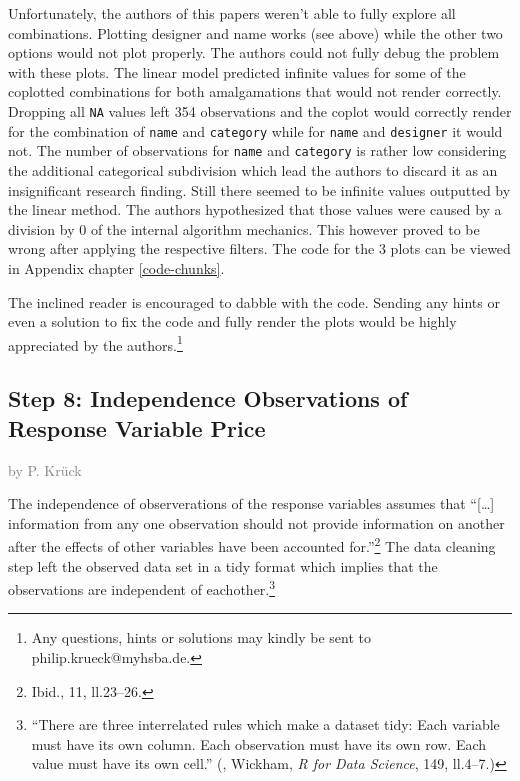 \documentclass[a4paper, nobind]{templates/ociamthesis}
\begin{document}
Unfortunately, the authors of this papers weren't able to fully explore all combinations.
Plotting designer and name works (see above) while the other two options would not plot properly.
The authors could not fully debug the problem with these plots.
The linear model predicted infinite values for some of the coplotted combinations for both amalgamations that would not render correctly.
Dropping all \texttt{NA} values left 354 observations and the coplot would correctly render for the combination of \texttt{name} and \texttt{category} while for \texttt{name} and \texttt{designer} it would not. The number of observations for \texttt{name} and \texttt{category} is rather low considering the additional categorical subdivision which lead the authors to discard it as an insignificant research finding.
Still there seemed to be infinite values outputted by the linear method. The authors hypothesized that those values were caused by a division by 0 of the internal algorithm mechanics. This however proved to be wrong after applying the respective filters.
The code for the 3 plots can be viewed in Appendix chapter \ref{code-chunks}.

The inclined reader is encouraged to dabble with the code. Sending any hints or even a solution to fix the code and fully render the plots would be highly appreciated by the authors.\footnote{Any questions, hints or solutions may kindly be sent to philip.krueck@myhsba.de.}

\hypertarget{step-8-independence-observations-of-response-variable-price}{%
\subsection{Step 8: Independence Observations of Response Variable Price}\label{step-8-independence-observations-of-response-variable-price}}

\textcolor{gray}{by P. Krück}

The independence of observerations of the response variables assumes that ``{[}\ldots{}{]} information from any one observation should not provide information on another after the effects of other variables have been accounted for.''\footnote{Ibid., 11, ll.23--26.}
The data cleaning step left the observed data set in a tidy format which implies that the observations are independent of eachother.\footnote{``There are three interrelated rules which make a dataset tidy: Each variable must have its own column. Each observation must have its own row. Each value must have its own cell.'' (, Wickham, \emph{R for Data Science}, 149, ll.4--7.)}
\end{document}
